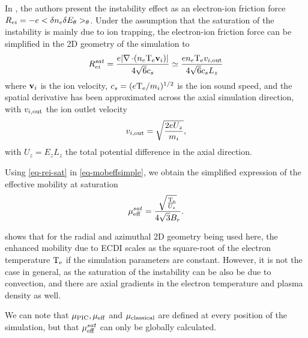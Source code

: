   In  \citet{lafleur2016}, the authors present the instability effect as an electron-ion friction force $R_{ei} = - e < \delta n_e \delta E_{\theta} >_{\theta}$.
  Under the assumption that the saturation of the instability is mainly due to ion trapping, the electron-ion friction force can be simplified in the \ac{2D} geometry of the simulation to
  \begin{equation} \label{eq-rei-sat}
    R_{ei}^{sat} = \frac{e \lvert\operatorname{{\mathbf \nabla}} \cdot (n_e \mathrm{T_e} {\mathbf v_i})\rvert}{4 \sqrt{6} c_s} \simeq \frac{e n_e \mathrm{T_e}  v_{i, \rm out} }{4 \sqrt 6 c_s L_z}
  \end{equation} 
  where ${\mathbf v_i}$ is the ion velocity, $c_s=(e \mathrm{T_e}/m_i)^{1/2}$  is the ion sound speed, and the spatial derivative has been approximated across the axial simulation direction, with $ v_{i, \rm out} $ the ion outlet velocity 
  \begin{equation} \label{eq-viz}
     v_{i, \rm out}  = \sqrt{\frac{2 e U_z}{m_i}},
  \end{equation}
  with $U_z = E_z L_z$ the total potential difference in the axial direction.
  
  Using \cref{eq-rei-sat} in \cref{eq-mobeffsimple}, we obtain the simplified expression of the effective mobility at saturation
  \begin{equation} \label{eq-mobeffsat}
    \mu_{\mathrm{eff}}^{sat} = \frac{\sqrt{\frac{\mathrm{T_e}}{U_z}}}{4\sqrt{3}B_r}.
  \end{equation}
  
   shows that for the radial and azimuthal \ac{2D} geometry being used here, the enhanced mobility due to \ac{ECDI} scales as the square-root of the electron temperature $\mathrm{T_e}$ if the simulation parameters are constant.
  However, it is not the case in general, as the saturation of the instability can be also be due to convection, and there are axial gradients in the electron temperature and plasma density as well.
  
  We can note that $\mu_{\mathrm{PIC}}, \mu_{\mathrm{eff}}$ and $\mu_{\mathrm{classical}}$ are defined at every position of the simulation, but that $\mu_{\mathrm{eff}}^{sat}$ can only be globally calculated. 
  
  
  
  
  